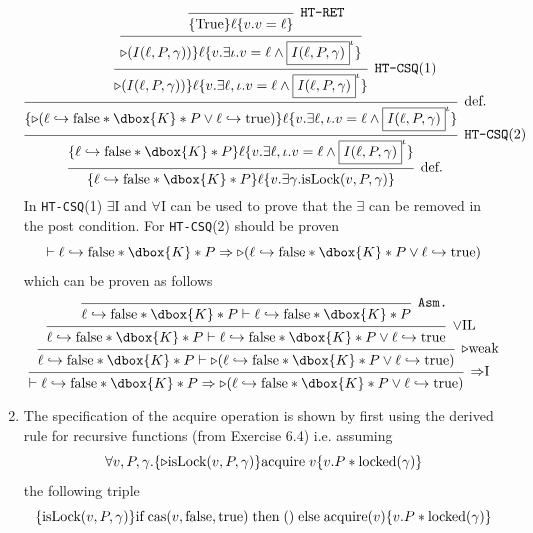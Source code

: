 \begin{enumerate}
  \[
  \begin{prooftree} 
    \infer0[\texttt{HT-RET}]{\{\text{True}\}  \ell \{v.v=\ell \}}
    \infer1[]{{\later(I(\ell, P, \gamma))\}  \ell \{v.\exists \iota . v=\ell \land \boxed{I(\ell, P, \gamma)}^\iota\}}}
    \infer1[\texttt{HT-CSQ}(1)]{{\later(I(\ell, P, \gamma))\}  \ell \{v.\exists \ell, \iota . v=\ell \land \boxed{I(\ell, P, \gamma)}^\iota\}}}
    \infer1[def.]{\{\later(\ell \hookrightarrow \text{false} * \dbox{K} * P \lor \ell\hookrightarrow \text{true})\}  \ell \{v.\exists \ell, \iota . v=\ell \land \boxed{I(\ell, P, \gamma)}^\iota\}}
    \infer1[\texttt{HT-CSQ}(2)]{\{\ell \hookrightarrow \text{false} * \dbox{K} * P\}  \ell \{v.\exists \ell, \iota . v=\ell \land \boxed{I(\ell, P, \gamma)}^\iota\}}
    \infer1[def.]{\{\ell \hookrightarrow \text{false} * \dbox{K} * P\} \ell \{v. \exists \gamma. \text{isLock} (v, P, \gamma)\}}
  \end{prooftree} 
  \]
  In \texttt{HT-CSQ}(1) $\exists$I and $\forall$I can be used to prove that the $\exists$ can be removed in the post condition. For \texttt{HT-CSQ}(2) should be proven 
  \[
    \vdash \ell \hookrightarrow \text{false} * \dbox{K} * P  \Rightarrow \later(\ell \hookrightarrow \text{false} * \dbox{K} * P \lor \ell\hookrightarrow \text{true})
  \]
  which can be proven as follows
  \[
  \begin{prooftree} 
    \infer0[\texttt{Asm.}]{\ell \hookrightarrow \text{false} * \dbox{K} * P  \vdash \ell \hookrightarrow \text{false} * \dbox{K} * P }
    \infer1[$\lor$IL]{\ell \hookrightarrow \text{false} * \dbox{K} * P  \vdash \ell \hookrightarrow \text{false} * \dbox{K} * P \lor \ell\hookrightarrow \text{true}}
    \infer1[$\later$weak]{\ell \hookrightarrow \text{false} * \dbox{K} * P  \vdash \later(\ell \hookrightarrow \text{false} * \dbox{K} * P \lor \ell\hookrightarrow \text{true})}
    \infer1[$\Rightarrow$I]{\vdash \ell \hookrightarrow \text{false} * \dbox{K} * P  \Rightarrow \later(\ell \hookrightarrow \text{false} * \dbox{K} * P \lor \ell\hookrightarrow \text{true})}
  \end{prooftree}
  \]
  \item The specification of the acquire operation is shown by first using the derived rule for recursive functions (from Exercise 6.4) i.e. assuming 
  \[
    \forall v, P, \gamma . \{\triangleright \text{isLock}(v, P, \gamma)\} \text{acquire} \; v \{v.P * \text{locked}(\gamma)\}
  \]
  the following triple 
  \[
    \{\text{isLock}(v,P, \gamma) \} \text{if} \; \text{cas} (v,\text{false},\text{true}) \; \text{then} \; () \; \text{else} \; \text{acquire}(v) \{v.P * \text{locked}(\gamma)\}
\]
\end{enumerate}
